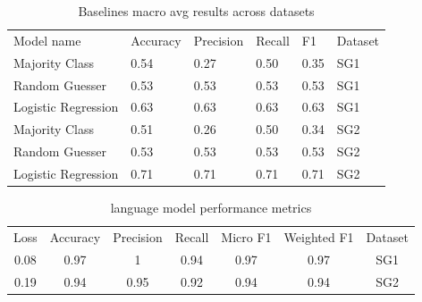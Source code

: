 \documentclass[11pt,a4paper]{article}
\begin{document}
\begin{table}[h]
\caption{Baselines macro avg results across datasets}
\small
\centering
\begin{tabular}{llllll}
{\color[HTML]{000000} Model name} & {\color[HTML]{000000} Accuracy} & {\color[HTML]{000000} Precision} & {\color[HTML]{000000} Recall} & F1   & Dataset \\
Majority Class                                           & 0.54                                                   & 0.27                                                    & 0.50                                                 & 0.35 & SG1     \\
Random Guesser                                           & 0.53                                                   & 0.53                                                    & 0.53                                                 & 0.53 & SG1     \\
Logistic Regression                                      & 0.63                                                   & 0.63                                                    & 0.63                                                 & 0.63 & SG1     \\
Majority Class                                           & 0.51                                                   & 0.26                                                    & 0.50                                                 & 0.34 & SG2     \\
Random Guesser                                           & 0.53                                                   & 0.53                                                    & 0.53                                                 & 0.53 & SG2     \\
Logistic Regression                                      & 0.71                                                   & 0.71                                                    & 0.71                                                 & 0.71 & SG2    
\end{tabular}
\end{table}

\begin{table}[h]
\caption{language model performance metrics}
\centering
\begin{tabular}{ccccccc}
Loss & \multicolumn{1}{l}{Accuracy} & \multicolumn{1}{l}{Precision} & \multicolumn{1}{l}{Recall} & \multicolumn{1}{l}{Micro F1} & \multicolumn{1}{l}{Weighted F1} & \multicolumn{1}{l}{Dataset} \\
0.08 & 0.97                         & 1                             & 0.94                       & 0.97                         & 0.97                            & SG1                         \\
0.19 & 0.94                         & 0.95                          & 0.92                       & 0.94                         & 0.94                            & SG2                        
\end{tabular}
\end{table}
\end{document}
